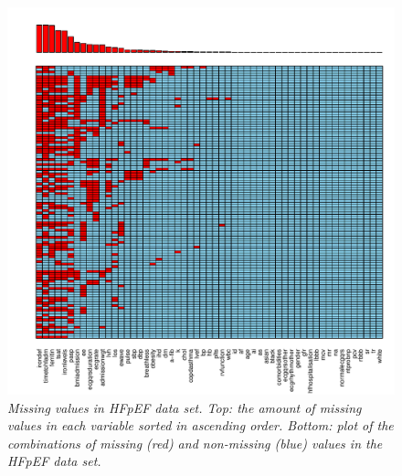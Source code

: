 \documentclass[../thesis.tex]{subfiles}
\begin{document}
\begin{figure}[h!]
    \centering
    \hspace*{-1cm}\includegraphics[width=1.1\textwidth]{doc/thesis/images/HFpEF_miss_dist.pdf}
    \caption[Missing values in HFpEF data set]{\textit{Missing values in HFpEF data set. Top:  the amount of missing values in each variable sorted in ascending order. Bottom: plot of the combinations of missing (red) and non-missing (blue) values in the HFpEF data set.}}
    \label{fig:HFpEF_missing}
\end{figure}

\newpage
\end{document}
